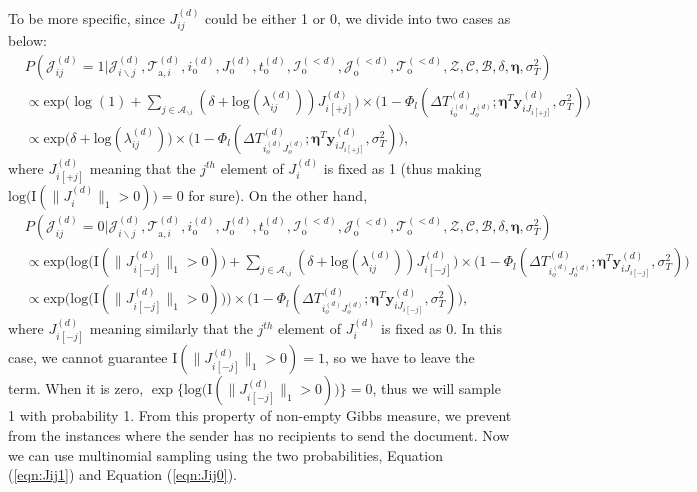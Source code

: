 \documentclass[twoside]{article}
\begin{document}
  	   To be more specific, since ${J}^{(d)}_{ij}$ could be either 1 or 0, we divide into two cases as below:
  	   \begin{equation}
  	   \begin{aligned}
  	   &P(\mathcal{J}^{(d)}_{ij}=1| \mathcal{J}^{(d)}_{i\backslash j}, \mathcal{T}^{(d)}_{\mbox{a}, i}, i^{(d)}_{\mbox{o}}, J^{(d)}_{\mbox{o}}, t^{(d)}_{\mbox{o}}, \mathcal{I}^{(<d)}_{\mbox{o}}, \mathcal{J}^{(<d)}_{\mbox{o}}, \mathcal{T}^{(<d)}_{\mbox{o}}, \mathcal{Z}, \mathcal{C}, \mathcal{B}, \delta, \boldsymbol{\eta}, \sigma_T^2)\\& \propto \mbox{exp}\Big(\log(1) +\sum_{j \in \mathcal{A}_{\backslash i}} ( \delta+\mbox{log}(\lambda_{ij}^{(d)}))J_{i[+j]}^{(d)}\Big) \times\Big(1 - \Phi_l(\Delta T^{(d)}_{i_o^{(d)}J_o^{(d)}};\boldsymbol{\eta}^T\boldsymbol{y}^{(d)}_{iJ_{i[+j]}}, \sigma_T^2)\Big)
  	   \\& \propto \mbox{exp}\Big(\delta+\mbox{log}(\lambda_{ij}^{(d)})\Big)\times\Big( 1 - \Phi_l(\Delta T^{(d)}_{i_o^{(d)}J_o^{(d)}};\boldsymbol{\eta}^T\boldsymbol{y}^{(d)}_{iJ_{i[+j]}}, \sigma_T^2)\Big),
  	   \end{aligned}\label{eqn:Jij1}
  	   \end{equation}
  	   where $J^{(d)}_{i[+j]}$ meaning that the $j^{th}$ element of $J_{i}^{(d)}$ is fixed as 1 (thus making $\mbox{log}\big(\text{I}(\lVert J_{i}^{(d)} \rVert_1 > 0 )\big) = 0$ for sure). On the other hand, 
  	   \begin{equation}
  	   \begin{aligned}
  	   &P(\mathcal{J}^{(d)}_{ij}=0| \mathcal{J}^{(d)}_{i\backslash j}, \mathcal{T}^{(d)}_{\mbox{a}, i}, i^{(d)}_{\mbox{o}}, J^{(d)}_{\mbox{o}}, t^{(d)}_{\mbox{o}}, \mathcal{I}^{(<d)}_{\mbox{o}}, \mathcal{J}^{(<d)}_{\mbox{o}}, \mathcal{T}^{(<d)}_{\mbox{o}}, \mathcal{Z}, \mathcal{C}, \mathcal{B}, \delta, \boldsymbol{\eta}, \sigma_T^2)\\& \propto \mbox{exp}\Big(\mbox{log}\big(\text{I}( \lVert J_{i[-j]}^{(d)} \rVert_1> 0 )\big) + \sum_{j \in \mathcal{A}_{\backslash i}} (\delta+\mbox{log}(\lambda_{ij}^{(d)}))J_{i[-j]}^{(d)} \Big)\times \Big( 1 - \Phi_l(\Delta T^{(d)}_{i_o^{(d)}J_o^{(d)}};\boldsymbol{\eta}^T\boldsymbol{y}^{(d)}_{iJ_{i[-j]}}, \sigma_T^2)\Big)
  	   \\& \propto \mbox{exp}\Big(\mbox{log}\big(\text{I}( \lVert J_{i[-j]}^{(d)} \rVert_1 > 0 )\big) \Big)\times \Big(1 - \Phi_l(\Delta T^{(d)}_{i_o^{(d)}J_o^{(d)}};\boldsymbol{\eta}^T\boldsymbol{y}^{(d)}_{iJ_{i[-j]}}, \sigma_T^2)\Big),
  	   \end{aligned}\label{eqn:Jij0}
  	   \end{equation}
  	   where $J^{(d)}_{i[-j]}$ meaning similarly that the $j^{th}$ element of $J_{i}^{(d)}$ is fixed as 0. In this case, we cannot guarantee $\text{I}( \lVert J_{i[-j]}^{(d)} \rVert_1 > 0)=1$, so we have to leave the term. When it is zero, $\exp\{\mbox{log}\big(\text{I}( \lVert J_{i[-j]}^{(d)} \rVert_1 > 0 )\big)\} = 0$, thus we will sample 1 with probability 1. From this property of non-empty Gibbs measure, we prevent from the instances where the sender has no recipients to send the document. Now we can use multinomial sampling using the two probabilities, Equation (\ref{eqn:Jij1}) and Equation (\ref{eqn:Jij0}).
\end{document}
